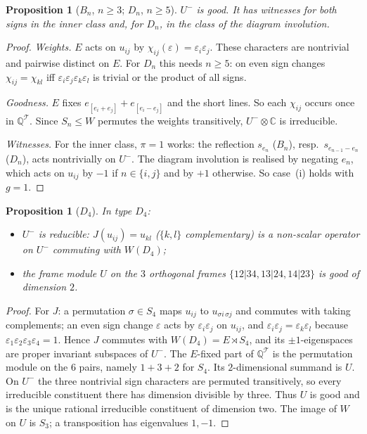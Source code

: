 \documentclass[11pt]{article}
\newtheorem{proposition}[theorem]{Proposition}
\theoremstyle{definition}
\newcommand{\Q}{\mathbb{Q}}
\newcommand{\C}{\mathbb{C}}
\newcommand{\T}{\mathcal{T}}
\begin{document}
\begin{proposition}[$B_n$, $n\ge3$; $D_n$, $n\ge5$]\label{prop:BD}
$U^-$ is good. It has witnesses for both signs in the inner class and, for $D_n$,
in the class of the diagram involution.
\end{proposition}
\begin{proof}
\emph{Weights.} $E$ acts on $u_{ij}$ by $\chi_{ij}(\varepsilon)=\varepsilon_i\varepsilon_j$. These characters are
nontrivial and pairwise distinct on $E$. For $D_n$ this needs $n\ge5$: on even sign changes $\chi_{ij}=\chi_{kl}$
iff $\varepsilon_i\varepsilon_j\varepsilon_k\varepsilon_l$ is trivial or the product of all signs.

\emph{Goodness.} $E$ fixes $e_{[e_i+e_j]}+e_{[e_i-e_j]}$ and the short lines. So each $\chi_{ij}$ occurs once in
$\Q^\T$. Since $S_n\le W$ permutes the weights transitively, $U^-\otimes\C$ is irreducible.

\emph{Witnesses.} For the inner class, $\pi=1$ works: the reflection
$s_{e_n}$ ($B_n$), resp.\ $s_{e_{n-1}-e_n}$ ($D_n$), acts nontrivially on $U^-$. The diagram involution is realised
by negating $e_n$, which acts on $u_{ij}$ by $-1$ if $n\in\{i,j\}$ and by $+1$ otherwise. So case~(i) holds with
$g=1$.
\end{proof}

\begin{proposition}[$D_4$]\label{prop:D4}
In type $D_4$:
\begin{itemize}
\item $U^-$ is reducible: $J(u_{ij})=u_{kl}$ ($\{k,l\}$ complementary) is a non-scalar operator on $U^-$ commuting with
$W(D_4)$;
\item the frame module $U$ on the $3$ orthogonal frames $\{12|34,13|24,14|23\}$ is good of dimension $2$.
\end{itemize}
\end{proposition}
\begin{proof}
For $J$: a permutation $\sigma\in S_4$ maps $u_{ij}$ to $u_{\sigma i\,\sigma j}$ and commutes with taking complements; an
even sign change $\varepsilon$ acts by $\varepsilon_i\varepsilon_j$ on $u_{ij}$, and
$\varepsilon_i\varepsilon_j=\varepsilon_k\varepsilon_l$ because $\varepsilon_1\varepsilon_2\varepsilon_3\varepsilon_4=1$. Hence
$J$ commutes with $W(D_4)=E\rtimes S_4$, and its $\pm1$-eigenspaces are proper invariant subspaces of $U^-$.
The $E$-fixed part of $\Q^\T$ is the permutation module on the $6$ pairs, namely $1+3+2$ for $S_4$. Its
$2$-dimensional summand is $U$. On $U^-$ the three nontrivial sign characters are permuted transitively,
so every irreducible constituent there has dimension divisible by three. Thus $U$ is good and is the
unique rational irreducible constituent of dimension two. The image of $W$ on $U$ is $S_3$;
a transposition has eigenvalues $1,-1$.
\end{proof}
\end{document}
